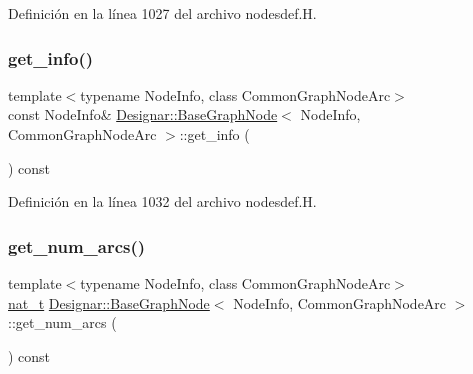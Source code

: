 Definición en la línea 1027 del archivo nodesdef.\+H.

\mbox{\label{class_designar_1_1_base_graph_node_a2f9f7069df485bc555066eb57d05e7a8}} 
\subsubsection{\texorpdfstring{get\+\_\+info()}{get\_info()}\hspace{0.1cm}{\footnotesize\ttfamily [2/2]}}
{\footnotesize\ttfamily template$<$typename Node\+Info, class Common\+Graph\+Node\+Arc$>$ \\
const Node\+Info\& \hyperlink{class_designar_1_1_base_graph_node}{Designar\+::\+Base\+Graph\+Node}$<$ Node\+Info, Common\+Graph\+Node\+Arc $>$\+::get\+\_\+info (\begin{DoxyParamCaption}{ }\end{DoxyParamCaption}) const\hspace{0.3cm}{\ttfamily [inline]}}



Definición en la línea 1032 del archivo nodesdef.\+H.

\mbox{\label{class_designar_1_1_base_graph_node_a3dbfd6cc251093522f54d51956968c54}} 
\subsubsection{\texorpdfstring{get\+\_\+num\+\_\+arcs()}{get\_num\_arcs()}}
{\footnotesize\ttfamily template$<$typename Node\+Info, class Common\+Graph\+Node\+Arc$>$ \\
\hyperlink{namespace_designar_aa72662848b9f4815e7bf31a7cf3e33d1}{nat\+\_\+t} \hyperlink{class_designar_1_1_base_graph_node}{Designar\+::\+Base\+Graph\+Node}$<$ Node\+Info, Common\+Graph\+Node\+Arc $>$\+::get\+\_\+num\+\_\+arcs (\begin{DoxyParamCaption}{ }\end{DoxyParamCaption}) const\hspace{0.3cm}{\ttfamily [inline]}}



